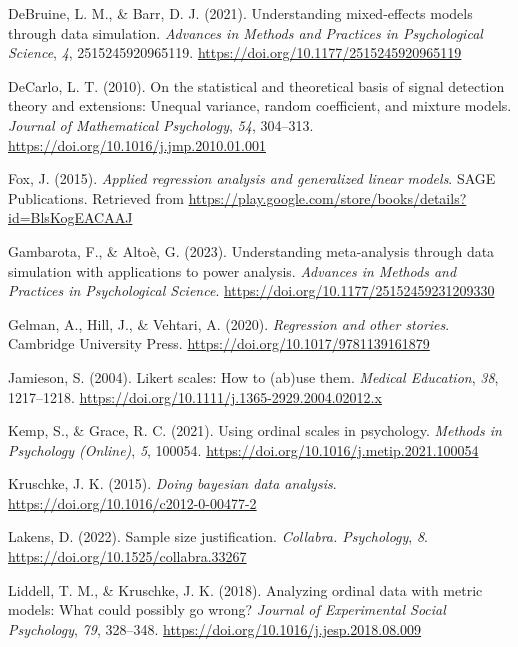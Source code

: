 \documentclass[
  man, mask,floatsintext]{apa6}
\newlength{\cslhangindent}
\newenvironment{CSLReferences}[2] %
 {\begin{list}{}{%
  \setlength{\itemindent}{0pt}
  \setlength{\leftmargin}{0pt}
  \setlength{\parsep}{0pt}
  \ifodd #1
   \setlength{\leftmargin}{\cslhangindent}
   \setlength{\itemindent}{-1\cslhangindent}
  \fi
  \setlength{\itemsep}{#2\baselineskip}}}
 {\end{list}}
\begin{document}
\begin{CSLReferences}{1}{0}
DeBruine, L. M., \& Barr, D. J. (2021). Understanding mixed-effects models through data simulation. \emph{Advances in Methods and Practices in Psychological Science}, \emph{4}, 2515245920965119. \url{https://doi.org/10.1177/2515245920965119}

DeCarlo, L. T. (2010). On the statistical and theoretical basis of signal detection theory and extensions: Unequal variance, random coefficient, and mixture models. \emph{Journal of Mathematical Psychology}, \emph{54}, 304--313. \url{https://doi.org/10.1016/j.jmp.2010.01.001}

Fox, J. (2015). \emph{Applied regression analysis and generalized linear models}. SAGE Publications. Retrieved from \url{https://play.google.com/store/books/details?id=BlsKogEACAAJ}

Gambarota, F., \& Altoè, G. (2023). Understanding meta-analysis through data simulation with applications to power analysis. \emph{Advances in Methods and Practices in Psychological Science}. \url{https://doi.org/10.1177/25152459231209330}

Gelman, A., Hill, J., \& Vehtari, A. (2020). \emph{Regression and other stories}. Cambridge University Press. \url{https://doi.org/10.1017/9781139161879}

Jamieson, S. (2004). Likert scales: How to (ab)use them. \emph{Medical Education}, \emph{38}, 1217--1218. \url{https://doi.org/10.1111/j.1365-2929.2004.02012.x}

Kemp, S., \& Grace, R. C. (2021). Using ordinal scales in psychology. \emph{Methods in Psychology (Online)}, \emph{5}, 100054. \url{https://doi.org/10.1016/j.metip.2021.100054}

Kruschke, J. K. (2015). \emph{Doing bayesian data analysis}. \url{https://doi.org/10.1016/c2012-0-00477-2}

Lakens, D. (2022). Sample size justification. \emph{Collabra. Psychology}, \emph{8}. \url{https://doi.org/10.1525/collabra.33267}

Liddell, T. M., \& Kruschke, J. K. (2018). Analyzing ordinal data with metric models: What could possibly go wrong? \emph{Journal of Experimental Social Psychology}, \emph{79}, 328--348. \url{https://doi.org/10.1016/j.jesp.2018.08.009}


\end{CSLReferences}
\end{document}

